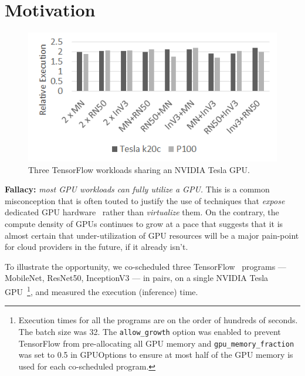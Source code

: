\section{Motivation}
\label{sec:motivation}

\begin{figure}[!th]
	\centering
	\includegraphics[width=.9\columnwidth]{images/shared-training.png}
	\caption{{\footnotesize Three TensorFlow workloads sharing an NVIDIA Tesla GPU. }}
	\label{fig:motivation}
\end{figure}

\textbf{Fallacy:} \emph{most GPU workloads can fully utilize a GPU.}
This is a common misconception that is often touted to justify
the use of techniques that \emph{expose} dedicated GPU hardware~\cite{AWS-gpu}
rather than \emph{virtualize} them.
On the contrary, the compute density of GPUs continues to grow at a pace
that suggests that it is almost certain that under-utilization of GPU
resources will be a major pain-point for cloud providers in the future, if it
already isn't.

To illustrate the opportunity, we co-scheduled three TensorFlow~\cite{
abadi2016tensorflow} programs --- MobileNet, ResNet50, InceptionV3 --- in
pairs, on a single NVIDIA Tesla~ GPU~\footnote{Execution times for all the programs are on the order of hundreds of seconds. The batch size was 32. The \texttt{allow\_growth}
option was enabled to prevent TensorFlow from pre-allocating all GPU
memory and \texttt{gpu\_memory\_fraction} was set to 0.5 in GPUOptions to
ensure at most half of the GPU memory is used for each co-scheduled program.}, and measured the execution (inference) time.

